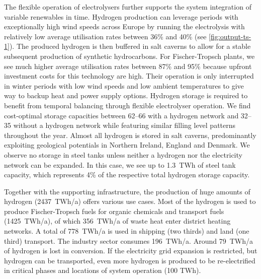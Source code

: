 
The flexible operation of electrolysers further supports the system integration
of variable renewables in time. Hydrogen production can leverage periods with
exceptionally high wind speeds across Europe by running the electrolysis with
relatively low average utilisation rates between 36\% and 40\% (see
\cref{fig:output-ts-1}). The produced hydrogen is then buffered in salt caverns
to allow for a stable subsequent production of synthetic hydrocarbons. For
Fischer-Tropsch plants, we see much higher average utilisation rates between
87\% and 95\% because upfront investment costs for this technology are high.
Their operation is only interrupted in winter periods with low wind speeds and
low ambient temperatures to give way to backup heat and power supply options.
Hydrogen storage is required to benefit from temporal balancing through flexible
electrolyser operation. We find cost-optimal storage capacities between
\SIrange{62}{66}{\twh} with a hydrogen network and \SIrange{32}{35}{\twh}
without a hydrogen network while featuring similar filling level patterns
throughout the year. Almost all hydrogen is stored in salt caverns,
predominantly exploiting geological potentials in Northern Ireland, England and
Denmark. We observe no storage in steel tanks unless neither a hydrogen nor the
electricity network can be expanded. In this case, we see up to 1.3~TWh of steel
tank capacity, which represents 4\% of the respective total hydrogen storage
capacity.



Together with the supporting infrastructure, the production of huge amounts of
hydrogen (2437~TWh/a) offers various use cases. Most of the hydrogen is used to
produce Fischer-Tropsch fuels for organic chemicals and transport fuels
(1425~TWh/a), of which 356~TWh/a of waste heat enter district heating networks.
A total of 778~TWh/a is used in shipping (two thirds) and land (one third)
transport. The industry sector consumes 196~TWh/a. Around 79~TWh/a of hydrogen
is lost in conversion. If the electricity grid expansion is restricted, but
hydrogen can be transported, even more hydrogen is produced to be re-electrified
in critical phases and locations of system operation (100 TWh\el).



